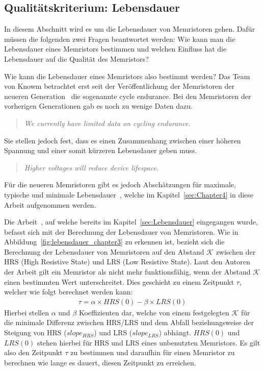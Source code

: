 \subsection{Qualitätskriterium: Lebensdauer}
  In diesem Abschnitt wird es um die Lebensdauer von Memristoren gehen. Dafür müssen die folgenden zwei Fragen beantwortet werden: Wie kann man die Lebensdauer eines Memristors bestimmen und welchen Einfluss hat die Lebensdauer auf die Qualität des Memristors?

  Wie kann die Lebensdauer eines Memristors also bestimmt werden? Das Team von Knowm betrachtet erst seit der Veröffentlichung der Memristoren der neueren Generation~\cite{knowm_comp_2019} die sogenannte \glqq cycle endurance\grqq. Bei den Memristoren der vorherigen Generationen gab es noch zu wenige Daten dazu.
  \begin{quotation}
    \textit{We currently have limited data on cycling endurance.}
  \end{quotation}
  Sie stellen jedoch fest, dass es einen Zusammenhang zwischen einer höheren Spannung und einer somit kürzeren Lebensdauer geben muss.
  \begin{quotation}
    \textit{Higher voltages will reduce device lifespace.}
  \end{quotation}
  Für die neueren Memristoren gibt es jedoch Abschätzungen für maximale, typische und minimale Lebensdauer~\cite{knowm_comp_2019}, welche im Kapitel~\ref{sec:Chapter4} in diese Arbeit aufgenommen werden.

  Die Arbeit~\cite{stat_lifetime}, auf welche bereits im Kapitel~\ref{sec:Lebensdauer} eingegangen wurde, befasst sich mit der Berechnung der Lebensdauer von Memristoren. Wie in Abbildung~\ref{fig:lebensdauer_chapter3} zu erkennen ist, bezieht sich die Berechnung der Lebensdauer von Memristoren auf den Abstand $\mathcal{K}$ zwischen der HRS (High Resistive State) und LRS (Low Resistive State). Laut den Autoren der Arbeit gilt ein Memristor als nicht mehr funktionsfähig, wenn der Abstand $\mathcal{K}$ einen bestimmten Wert unterschreitet. Dies geschieht zu einem Zeitpunkt $\tau$, welcher wie folgt berechnet werden kann:
  \begin{align}
    \tau = \alpha \times HRS(0) - \beta \times LRS(0)
  \end{align}
  Hierbei stellen $\alpha$ und $\beta$ Koeffizienten dar, welche von einem festgelegten $\mathcal{K}$ für die minimale Differenz zwischen HRS/LRS und dem Abfall beziehungsweise der Steigung von HRS ($slope_{HRS}$) und LRS ($slope_{LRS}$) abhängt. $HRS(0)$ und $LRS(0)$ stehen hierbei für HRS und LRS eines unbenutzten Memristors. Es gilt also den Zeitpunkt $\tau$ zu bestimmen und daraufhin für einen Memristor zu berechnen wie lange es dauert, diesen Zeitpunkt zu erreichen.

